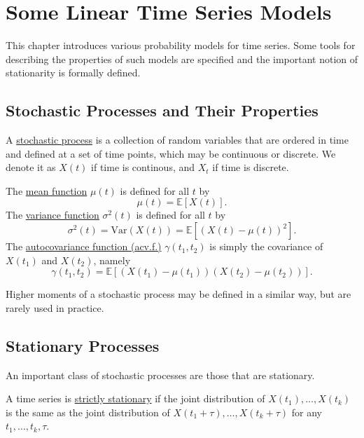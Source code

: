 \section{Some Linear Time Series Models}
This chapter introduces various probability models for time series. Some tools for describing the properties of 
such models are specified and the important notion of stationarity is formally defined.


\subsection{Stochastic Processes and Their Properties}
\begin{definition*}[]
A \underline{stochastic process} is a collection of random variables that are ordered in time and defined at a 
set of time points, which may be continuous or discrete. We denote it as $X(t)$ if time is continous, and $X_t$ 
if time is discrete.
\end{definition*}

\begin{definition*}[]
The \underline{mean function} $\mu(t)$ is defined for all $t$ by 
\[ \mu(t) = \mathbb{E}\left[ X(t) \right]. \]
The \underline{variance function} $\sigma^2(t)$ is defined for all $t$ by 
\[ \sigma^2(t) = \mathrm{Var}(X(t)) = \mathbb{E}\left[ (X(t) - \mu(t))^2 \right]. \]
The \underline{autocovariance function (acv.f.)} $\gamma(t_1, t_2)$ is simply the covariance of $X(t_1)$ and $X(t_2)$, namely 
\[ \gamma(t_1, t_2) = \mathbb{E}\left[ (X(t_1) - \mu(t_1))(X(t_2) - \mu(t_2)) \right]. \]
\end{definition*}

Higher moments of a stochastic process may be defined in a similar way, but are rarely used in practice.



\subsection{Stationary Processes}
An important class of stochastic processes are those that are stationary.

\begin{definition*}[]
A time series is \underline{strictly stationary} if the joint distribution of $X(t_1), \dots, X(t_k)$ is the same as the joint distribution of $X(t_1 + \tau), \dots, X(t_k + \tau)$ for any $t_1, \dots, t_k, \tau$.
\end{definition*}

